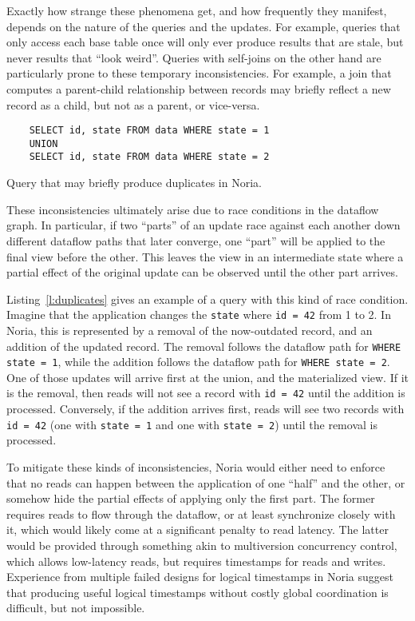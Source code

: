 Exactly how strange these phenomena get, and how frequently they manifest,
depends on the nature of the queries and the updates. For example, queries that
only access each base table once will only ever produce results that are stale,
but never results that ``look weird''. Queries with self-joins on the other hand
are particularly prone to these temporary inconsistencies. For example, a join
that computes a parent-child relationship between records may briefly reflect a
new record as a child, but not as a parent, or vice-versa.

\begin{listing}[h]
  \begin{verbatim}
    SELECT id, state FROM data WHERE state = 1
    UNION
    SELECT id, state FROM data WHERE state = 2
  \end{verbatim}
  \caption{Query that may briefly produce duplicates in Noria.}
  \label{l:duplicates}
\end{listing}

These inconsistencies ultimately arise due to race conditions in the dataflow
graph. In particular, if two ``parts'' of an update race against each another
down different dataflow paths that later converge, one ``part'' will be applied
to the final view before the other. This leaves the view in an intermediate
state where a partial effect of the original update can be observed until the
other part arrives.

Listing~\ref{l:duplicates} gives an example of a query with this kind of race
condition. Imagine that the application changes the \texttt{state} where
\texttt{id = 42} from 1 to 2. In Noria, this is represented by a removal of the
now-outdated record, and an addition of the updated record. The removal follows
the dataflow path for \texttt{WHERE state = 1}, while the addition follows the
dataflow path for \texttt{WHERE state = 2}. One of those updates will arrive
first at the union, and the materialized view. If it is the removal, then reads
will not see a record with \texttt{id = 42} until the addition is processed.
Conversely, if the addition arrives first, reads will see two records with
\texttt{id = 42} (one with \texttt{state = 1} and one with \texttt{state = 2})
until the removal is processed.

To mitigate these kinds of inconsistencies, Noria would either need to enforce
that no reads can happen between the application of one ``half'' and the other,
or somehow hide the partial effects of applying only the first part. The former
requires reads to flow through the dataflow, or at least synchronize closely
with it, which would likely come at a significant penalty to read latency. The
latter would be provided through something akin to multiversion concurrency
control, which allows low-latency reads, but requires timestamps for reads and
writes. Experience from multiple failed designs for logical timestamps in Noria
suggest that producing useful logical timestamps without costly global
coordination is difficult, but not impossible.

